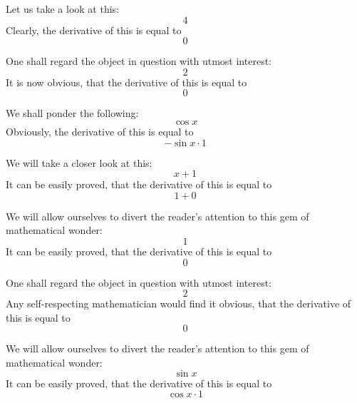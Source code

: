\documentclass{article}
\begin{document}
Let us take a look at this:
\begin{equation}
4 
\end{equation}
Clearly, the derivative of this is equal to
\begin{equation}
0 
\end{equation}

One shall regard the object in question with utmost interest:
\begin{equation}
2 
\end{equation}
It is now obvious, that the derivative of this is equal to
\begin{equation}
0 
\end{equation}

We shall ponder the following:
\begin{equation}
\cos x 
\end{equation}
Obviously, the derivative of this is equal to
\begin{equation}
-\sin x \cdot 1 
\end{equation}

We will take a closer look at this:
\begin{equation}
x + 1 
\end{equation}
It can be easily proved, that the derivative of this is equal to
\begin{equation}
1 + 0 
\end{equation}

We will allow ourselves to divert the reader's attention to this gem of mathematical wonder:
\begin{equation}
1 
\end{equation}
It can be easily proved, that the derivative of this is equal to
\begin{equation}
0 
\end{equation}

One shall regard the object in question with utmost interest:
\begin{equation}
2 
\end{equation}
Any self-respecting mathematician would find it obvious, that the derivative of this is equal to
\begin{equation}
0 
\end{equation}

We will allow ourselves to divert the reader's attention to this gem of mathematical wonder:
\begin{equation}
\sin x 
\end{equation}
It can be easily proved, that the derivative of this is equal to
\begin{equation}
\cos x \cdot 1 
\end{equation}
\end{document}
